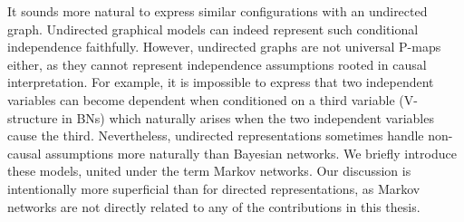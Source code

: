 It sounds more natural to express similar configurations with an undirected graph. Undirected graphical models can indeed represent such conditional independence faithfully. However, undirected graphs are not universal P-maps either, as they cannot represent independence assumptions rooted in causal interpretation. For example, it is impossible to express that two independent variables can become dependent when conditioned on a third variable (V-structure in BNs) which naturally arises when the two independent variables cause the third. Nevertheless, undirected representations sometimes handle non-causal assumptions more naturally than Bayesian networks. We briefly introduce these models, united under the term Markov networks. Our discussion is intentionally more superficial than for directed representations, as Markov networks are not directly related to any of the contributions in this thesis.
